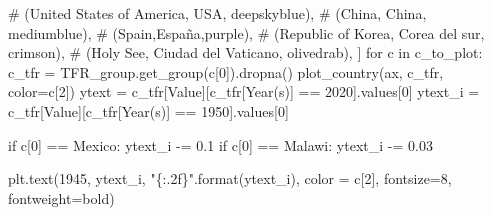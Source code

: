 \documentclass[
  letterpaper,
  DIV=11,
  numbers=noendperiod]{scrreprt}
\newenvironment{Shaded}{\begin{snugshade}}{\end{snugshade}}
\newcommand{\BuiltInTok}[1]{\textcolor[rgb]{0.00,0.23,0.31}{#1}}
\newcommand{\CommentTok}[1]{\textcolor[rgb]{0.37,0.37,0.37}{#1}}
\newcommand{\ControlFlowTok}[1]{\textcolor[rgb]{0.00,0.23,0.31}{#1}}
\newcommand{\DecValTok}[1]{\textcolor[rgb]{0.68,0.00,0.00}{#1}}
\newcommand{\FloatTok}[1]{\textcolor[rgb]{0.68,0.00,0.00}{#1}}
\newcommand{\KeywordTok}[1]{\textcolor[rgb]{0.00,0.23,0.31}{#1}}
\newcommand{\NormalTok}[1]{\textcolor[rgb]{0.00,0.23,0.31}{#1}}
\newcommand{\OperatorTok}[1]{\textcolor[rgb]{0.37,0.37,0.37}{#1}}
\newcommand{\SpecialCharTok}[1]{\textcolor[rgb]{0.37,0.37,0.37}{#1}}
\newcommand{\StringTok}[1]{\textcolor[rgb]{0.13,0.47,0.30}{#1}}
\begin{document}
\begin{Shaded}
\begin{Highlighting}[]
\CommentTok{\#             (\textquotesingle{}United States of America\textquotesingle{}, \textquotesingle{}USA\textquotesingle{}, \textquotesingle{}deepskyblue\textquotesingle{}),}
\CommentTok{\#             (\textquotesingle{}China\textquotesingle{}, \textquotesingle{}China\textquotesingle{}, \textquotesingle{}mediumblue\textquotesingle{}),}
\CommentTok{\#             (\textquotesingle{}Spain\textquotesingle{},\textquotesingle{}España\textquotesingle{},\textquotesingle{}purple\textquotesingle{}),}
\CommentTok{\#             (\textquotesingle{}Republic of Korea\textquotesingle{}, \textquotesingle{}Corea del sur\textquotesingle{}, \textquotesingle{}crimson\textquotesingle{}),}
\CommentTok{\#             (\textquotesingle{}Holy See\textquotesingle{}, \textquotesingle{}Ciudad del Vaticano\textquotesingle{}, \textquotesingle{}olivedrab\textquotesingle{}),}
\NormalTok{            ]}
\ControlFlowTok{for}\NormalTok{ c }\KeywordTok{in}\NormalTok{ c\_to\_plot:}
\NormalTok{    c\_tfr }\OperatorTok{=}\NormalTok{ TFR\_group.get\_group(c[}\DecValTok{0}\NormalTok{]).dropna()}
\NormalTok{    plot\_country(ax, c\_tfr, color}\OperatorTok{=}\NormalTok{c[}\DecValTok{2}\NormalTok{])}
\NormalTok{    ytext }\OperatorTok{=}\NormalTok{ c\_tfr[}\StringTok{\textquotesingle{}Value\textquotesingle{}}\NormalTok{][c\_tfr[}\StringTok{\textquotesingle{}Year(s)\textquotesingle{}}\NormalTok{] }\OperatorTok{==} \DecValTok{2020}\NormalTok{].values[}\DecValTok{0}\NormalTok{]}
\NormalTok{    ytext\_i }\OperatorTok{=}\NormalTok{ c\_tfr[}\StringTok{\textquotesingle{}Value\textquotesingle{}}\NormalTok{][c\_tfr[}\StringTok{\textquotesingle{}Year(s)\textquotesingle{}}\NormalTok{] }\OperatorTok{==} \DecValTok{1950}\NormalTok{].values[}\DecValTok{0}\NormalTok{]}

    \ControlFlowTok{if}\NormalTok{ c[}\DecValTok{0}\NormalTok{] }\OperatorTok{==} \StringTok{\textquotesingle{}Mexico\textquotesingle{}}\NormalTok{:}
\NormalTok{        ytext\_i }\OperatorTok{{-}=} \FloatTok{0.1}
    \ControlFlowTok{if}\NormalTok{ c[}\DecValTok{0}\NormalTok{] }\OperatorTok{==} \StringTok{\textquotesingle{}Malawi\textquotesingle{}}\NormalTok{:}
\NormalTok{        ytext\_i }\OperatorTok{{-}=} \FloatTok{0.03}
        
\NormalTok{    plt.text(}\DecValTok{1945}\NormalTok{, ytext\_i, }\StringTok{"}\SpecialCharTok{\{:.2f\}}\StringTok{"}\NormalTok{.}\BuiltInTok{format}\NormalTok{(ytext\_i), color }\OperatorTok{=}\NormalTok{ c[}\DecValTok{2}\NormalTok{], fontsize}\OperatorTok{=}\DecValTok{8}\NormalTok{, fontweight}\OperatorTok{=}\StringTok{\textquotesingle{}bold\textquotesingle{}}\NormalTok{)}


\end{Highlighting}
\end{Shaded}
\end{document}
